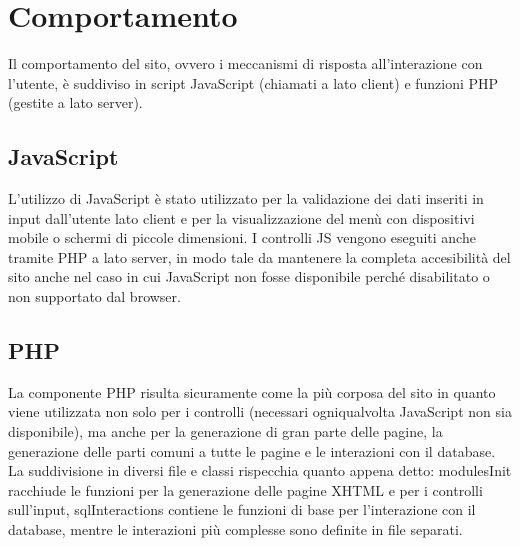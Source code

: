\section{Comportamento}
Il comportamento del sito, ovvero i meccanismi di risposta all'interazione con l'utente, è suddiviso in script JavaScript (chiamati a lato client) e funzioni PHP (gestite a lato server).
    \subsection{JavaScript}
        L'utilizzo di JavaScript è stato utilizzato per la validazione dei dati inseriti in input dall'utente lato client e per la visualizzazione del menù con dispositivi mobile o schermi di piccole dimensioni.
        I controlli JS vengono eseguiti anche tramite PHP a lato server, in modo tale da mantenere la completa accesibilità del sito anche nel caso in cui JavaScript non fosse disponibile perché disabilitato o non supportato dal browser.
    \subsection{PHP}
        La componente PHP risulta sicuramente come la più corposa del sito in quanto viene utilizzata non solo per i controlli (necessari ogniqualvolta JavaScript non sia disponibile), ma anche per la generazione di gran parte delle pagine, la generazione delle parti comuni a tutte le pagine e le interazioni con il database. La suddivisione in diversi file e classi rispecchia quanto appena detto: modulesInit racchiude le funzioni per la generazione delle pagine XHTML e per i controlli sull'input, sqlInteractions contiene le funzioni di base per l'interazione con il database, mentre le interazioni più complesse sono definite in file separati.
       
\pagebreak
